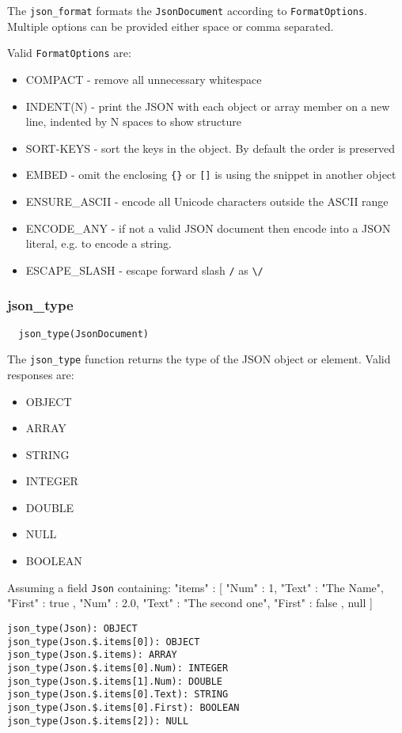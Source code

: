 The \verb`json_format` formats the \verb`JsonDocument` according to
\verb`FormatOptions`.  Multiple options can be provided either space
or comma separated.

Valid \verb`FormatOptions` are:
\begin{itemize}
\item COMPACT - remove all unnecessary whitespace
\item INDENT(N) - print the JSON with each object or array member on a new line,
indented by N spaces to show structure
\item SORT-KEYS - sort the keys in the object.  By default the order is preserved
\item EMBED - omit the enclosing \verb`{}` or \verb`[]` is using the snippet in another object
\item ENSURE\_ASCII - encode all Unicode characters outside the ASCII range
\item ENCODE\_ANY - if not a valid JSON document then encode into a JSON literal, e.g. to encode a string.
\item ESCAPE\_SLASH - escape forward slash \verb`/` as \verb`\/`
\end{itemize}

\subsubsection{json\_type}

\begin{verbatim}
  json_type(JsonDocument)
\end{verbatim}

The \verb`json_type` function returns the type of the JSON object or element.
Valid responses are:
\begin{itemize}
\item OBJECT
\item ARRAY
\item STRING
\item INTEGER
\item DOUBLE
\item NULL
\item BOOLEAN
\end{itemize}

Assuming a field \verb`Json` containing:
{
  "items" : [
    {
      "Num" : 1,
      "Text" : "The Name",
      "First" : true
    },
    {
      "Num" : 2.0,
      "Text" : "The second one",
      "First" : false
    }
    ,
    null
  ]
}
\begin{verbatim}
json_type(Json): OBJECT
json_type(Json.$.items[0]): OBJECT
json_type(Json.$.items): ARRAY
json_type(Json.$.items[0].Num): INTEGER
json_type(Json.$.items[1].Num): DOUBLE
json_type(Json.$.items[0].Text): STRING
json_type(Json.$.items[0].First): BOOLEAN
json_type(Json.$.items[2]): NULL
\end{verbatim}

